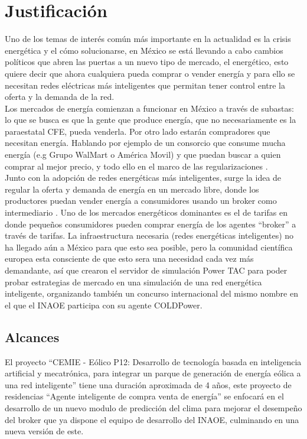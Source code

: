 \section{Justificación}
Uno de los temas de interés común más importante en la actualidad es la crisis energética y el cómo solucionarse, en México se está llevando a cabo cambios políticos que abren las puertas a un nuevo tipo de mercado, el energético, esto quiere decir que ahora cualquiera pueda comprar o vender energía y para ello se necesitan redes eléctricas más inteligentes que permitan tener control entre la oferta y la demanda de la red.
\\

Los mercados de energía comienzan a funcionar en México a través de subastas: lo que se busca es que la gente que produce energía, que no necesariamente es la paraestatal CFE, pueda venderla. Por otro lado estarán compradores  que necesitan energía. Hablando por ejemplo de un consorcio que consume mucha energía (e.g Grupo WalMart o América Movil) y que puedan buscar a quien comprar al mejor precio, y todo ello en el marco de las regularizaciones \cite{GRiveraProyectoDeIADelInaoe}.\\

Junto con la adopción de redes energéticas más inteligentes, surge la idea de regular la oferta y demanda de energía en un mercado libre, donde los productores puedan vender energía a consumidores usando un broker como intermediario \cite{Fixed-priceTariffG2015}. 
Uno de los mercados energéticos dominantes es el de tarifas en donde pequeños consumidores pueden comprar energía de los agentes ``broker'' a través de tarifas.
La infraestructura necesaria (redes energéticas inteligentes) no ha llegado aún a México para que esto sea posible, pero la comunidad científica europea esta consciente de que esto sera una necesidad cada vez más demandante, así que crearon el servidor de simulación Power TAC para poder probar estrategias de mercado en una simulación de una red energética inteligente, organizando también un concurso internacional del mismo nombre en el que el INAOE participa con su agente COLDPower.

\subsection{Alcances}

El proyecto ``CEMIE - Eólico P12: Desarrollo de tecnología basada en inteligencia artificial y mecatrónica, para integrar un parque de generación de energía eólica a una red inteligente'' tiene una duración aproximada de 4 años, este proyecto de
residencias ``Agente inteligente de compra venta de energía'' se enfocará en el desarrollo de un nuevo modulo de predicción del clima para mejorar el desempeño del broker que ya dispone el equipo de desarrollo del INAOE, culminando en una nueva versión de este. 

